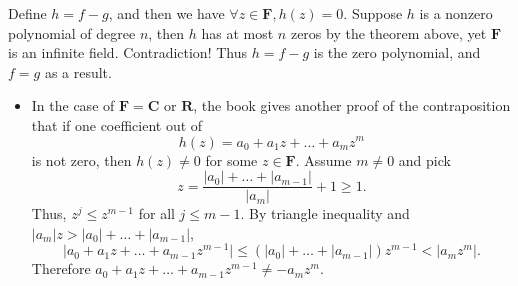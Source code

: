 \documentclass[11pt]{article}
\newcommand{\R}{\mathbf{R}}
\newcommand{\C}{\mathbf{C}}
\newcommand{\F}{\mathbf{F}}
\newcommand{\abs}[1]{\lvert #1 \rvert}
\begin{document}
\begin{itemize}
    Define $h = f-g$, and then we have $\forall z\in\F, h(z) = 0$. Suppose $h$ is a nonzero polynomial of degree $n$, then $h$ has at most $n$ zeros by the theorem above, yet $\F$ is an infinite field. Contradiction! Thus $h = f-g$ is the zero polynomial, and $f = g$ as a result.
    
    \begin{itemize}
        \item In the case of $\F = \C$ or $\R$, the book gives another proof of the contraposition that if one coefficient out of $$h(z) = a_0+a_1z+\dots+a_mz^m$$ is not zero, then $h(z) \not= 0$ for some $z \in \F$. Assume $m \not= 0$ and pick $$z = \frac{\abs{a_0} + \dots + \abs{a_{m-1}}}{\abs{a_m}}+1 \geq 1.$$ Thus, $z^j \leq z^{m-1}$ for all $j \leq m-1$. By triangle inequality and $\abs{a_m}z > \abs{a_0} + \dots + \abs{a_{m-1}}$, \[\abs{a_0+a_1z+\dots+a_{m-1}z^{m-1}} \leq (\abs{a_0}+\dots+\abs{a_{m-1}})z^{m-1} < \abs{a_m z^m}.\] Therefore $a_0+a_1z+\dots+a_{m-1}z^{m-1} \not= -a_m z^m$.
    \end{itemize}
    

\end{itemize}
\end{document}
